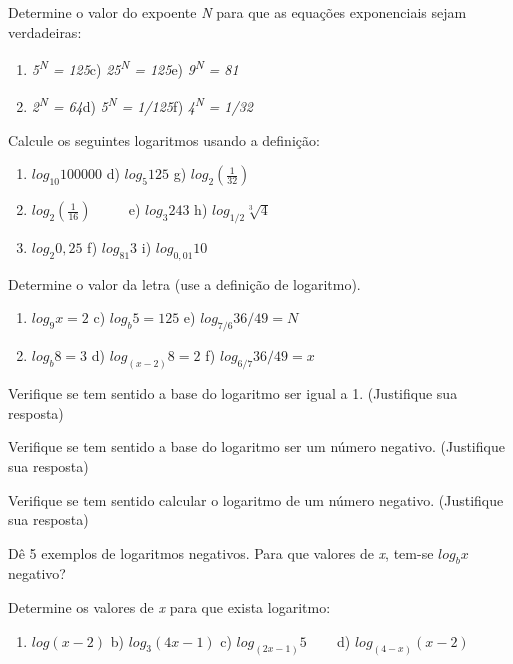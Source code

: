 \begin{exercicios}
	\exitem{} Determine o valor do expoente \textit{N} para que as equações exponenciais sejam verdadeiras:

\begin{enumerate}
	\item \textit{5\textsuperscript{N} = 125\quad \quad }c) \textit{25\textsuperscript{N} = 125\quad \quad }e) \textit{9\textsuperscript{N} = 81}

	\item \textit{2\textsuperscript{N} = 64\quad }\quad d) \textit{5\textsuperscript{N} = 1/125\quad \quad }f)\textit{ 4\textsuperscript{N} = 1/32}
\end{enumerate}

	\exitem{} Calcule os seguintes logaritmos usando a definição:

\begin{enumerate}
	\item  \( log_{10}100000 \) \quad \quad d)  \( log_{5}125 \) \quad \quad g)  \( log_{2} \left( \frac{1}{32} \right)  \) 

	\item  \( log_{2} \left( \frac{1}{16} \right)  \) ~~~~ \quad \quad e)  \( log_{3}243 \) \quad \quad h)  \( log_{1/2}\sqrt[3]{4} \) 

	\item  \( log_{2}0,25 \) \quad \quad \quad f)  \( log_{81}3 \) \quad \quad i)  \( log_{0,01}10 \) 
\end{enumerate}

	\exitem{} Determine o valor da letra (use a definição de logaritmo). 

\begin{enumerate}
	\item  \( log_{9}x=2 \) \quad \quad c)  \( log_{b}5=125 \) \quad \quad e)  \( log_{7/6}36/49=N \) 

	\item  \( log_{b}8=3 \) \quad \quad d)  \( log_{ \left( x-2 \right) }8=2 \) \quad \quad f)  \( log_{6/7}36/49=x \) 
\end{enumerate}

	\exitem{} Verifique se tem sentido a base do logaritmo ser igual a 1. (Justifique sua resposta)

	\exitem{} Verifique se tem sentido a base do logaritmo ser um número negativo. (Justifique sua resposta)

	\exitem{} Verifique se tem sentido calcular o logaritmo de um número negativo. (Justifique sua resposta)

	\exitem{} Dê 5 exemplos de logaritmos negativos. Para que valores de \textit{x}, tem-se \(  log_{b}x \)  negativo?

	\exitem{} Determine os valores de \textit{x} para que exista logaritmo:

    \begin{enumerate}
	    \item  \( log \left( x-2 \right)  \) \quad b)  \( log_{3} \left( 4x-1 \right)  \) \quad c)  \( log_{ \left( 2x-1 \right) }5 \) \quad ~~~ d)  \( log_{ \left( 4-x \right) } \left( x-2 \right)  \) \quad 
    \end{enumerate}

\end{exercicios}

